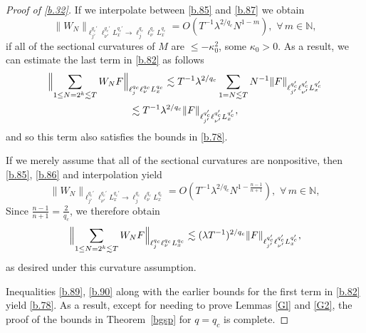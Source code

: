 \documentclass[10pt]{amsart}
\newcommand{\la}{\lambda}
\newcommand{\1}{{\bf 1}}
\begin{document}
\begin{proof}[Proof of \eqref{b.32}]
If we interpolate between \eqref{b.85} and \eqref{b.87} we obtain
\begin{equation}\label{b.88} \|W_N\|_{\ell^{q_c'}_{j'}\ell^{q_c'}_{\nu'}L^{q_c'}_x \to \ell^{q_c}_j \ell^{q_c}_\nu L^{q_c}_x}=
O(T^{-1}\la^{2/q_c}N^{1-m}), \, \,  \forall \, m\in {\mathbb N},
\end{equation}
if all of the sectional curvatures of $M$ are $\le -\kappa_0^2$, some $\kappa_0>0$.  As a result, we can estimate the
last term in \eqref{b.82} as follows
\begin{multline}\label{b.89}
\Bigl\|
\sum_{1\le N=2^k\lesssim T}W_NF\Bigr\|_{\ell_j^{q_c}\ell^{q_c}_\nu L^{q_c}_x}\lesssim
T^{-1}\la^{2/q_c}\sum_{1=N\lesssim T}N^{-1}
\|F\|_{\ell^{q_c'}_{j'}\ell^{q_c'}_{\nu'}L^{q_c'}_x}
\\
\lesssim T^{-1}\la^{2/q_c}
\|F\|_{\ell^{q_c'}_{j'}\ell^{q_c'}_{\nu'}L^{q_c'}_x},
\end{multline}
and so this term also satisfies the bounds in \eqref{b.78}.


If we merely assume that all of the sectional curvatures are nonpositive, then \eqref{b.85}, \eqref{b.86} and interpolation yield
\begin{equation*}
\|W_N\|_{\ell^{q_c'}_{j'}\ell^{q_c'}_{\nu'}L^{q_c'}_x \to \ell^{q_c}_j \ell^{q_c}_\nu L^{q_c}_x}=
O(T^{-1}\la^{2/q_c}N^{1-\frac{n-1}{n+1}}), \, \,  \forall \, m\in {\mathbb N},
\end{equation*}
Since $\tfrac{n-1}{n+1}=\tfrac2{q_c}$, we therefore obtain
\begin{equation}\label{b.90}
\Bigl\|
\sum_{1\le N=2^k\lesssim T}W_NF\Bigr\|_{\ell_j^{q_c}\ell^{q_c}_\nu L^{q_c}_x} \lesssim
(\la T^{-1})^{2/q_c}\|F\|_{\ell^{q_c'}_{j'}\ell^{q_c'}_{\nu'}L^{q_c'}_x},
\end{equation}
as desired under this curvature assumption.


Inequalities \eqref{b.89}, \eqref{b.90} along with the earlier bounds for the first term in \eqref{b.82} yield \eqref{b.78}.
As a result, except for needing to prove Lemmas \ref{Gl} and \ref{G2}, the proof of the bounds in
Theorem~\ref{bgsp} for $q=q_c$ is complete.



\end{proof}
\end{document}
